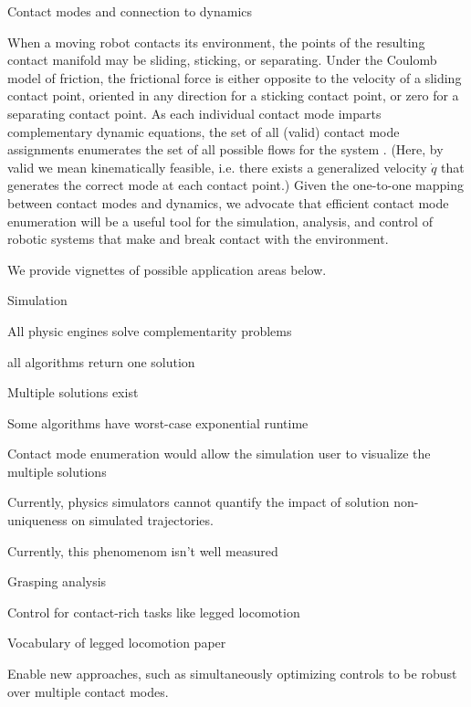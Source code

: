 \documentclass[conference]{IEEEtran}
\begin{document}
\begin{inparaenum}
    \item Contact modes and connection to dynamics
    \begin{inparaenum}
        \item 
        When a moving robot contacts its environment, the points of the
        resulting contact manifold may be sliding, sticking, or separating.
        Under the Coulomb model of friction, the frictional force is either
        opposite to the velocity of a sliding contact point, oriented in any
        direction for a sticking contact point, or zero for a separating
        contact point.
        As each individual contact mode imparts complementary dynamic equations,
        the set of all (valid) contact mode assignments enumerates the set of
        all possible flows for the system \cite{johnson_hybrid_2016}.
        (Here, by valid we mean kinematically feasible, i.e. there exists a
        generalized velocity $\dot{q}$ that generates the correct mode at
        each contact point.)
        Given the one-to-one mapping between contact modes and dynamics, we
        advocate that efficient contact mode enumeration will be a useful tool
        for the simulation, analysis, and control of robotic systems that make
        and break contact with the environment.
    \end{inparaenum}
    \item We provide vignettes of possible application areas below.
    \item Simulation
    \begin{inparaenum}
        \item All physic engines solve complementarity problems 
        \item all algorithms return one solution
        \item Multiple solutions exist
        \item Some algorithms have worst-case exponential runtime 
        \item Contact mode enumeration would allow the simulation user to
        visualize the multiple solutions
        \item Currently, physics simulators cannot quantify the impact of
        solution non-uniqueness on simulated trajectories.
        \item Currently, this phenomenom isn't well measured 
    \end{inparaenum}
    \item Grasping analysis
    \item Control for contact-rich tasks like legged locomotion
    \begin{inparaenum}
        \item Vocabulary of legged locomotion paper 
        \item Enable new approaches, such as simultaneously optimizing controls
        to be robust over multiple contact modes.
    \end{inparaenum}


\end{inparaenum}
\end{document}
